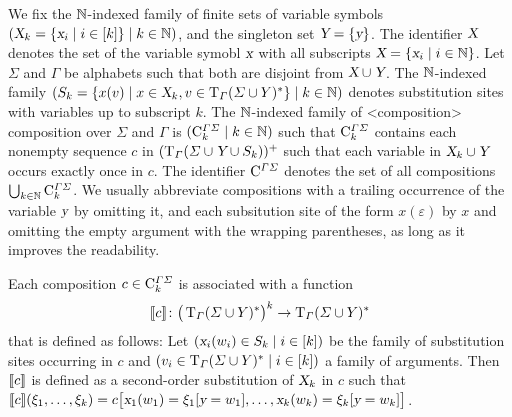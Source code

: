 \documentclass[../../document.tex]{subfiles}
\begin{document}
    \begin{definition}[Composition]
        We fix the \(\mathbb{N}\)-indexed family of finite sets of variable symbols \((\textsl{X}_k = \{\textsl{x}_i \mid i \in [k]\} \mid k \in \mathbb{N})\), and the singleton set \(\textsl{Y} = \{\textsl{y}\}\).
        The identifier \(\textsl{X}\) denotes the set of the variable symobl \(\textsl{x}\) with all subscripts \(\textsl{X} = \{\textsl{x}_i \mid i \in \mathbb{N}\}\).
        Let \(\varSigma\) and \(\varGamma\) be alphabets such that both are disjoint from \(\textsl{X} \cup \textsl{Y}\).
        The \(\mathbb{N}\)-indexed family \((S_k = \{x(v) \mid x \in \textsl{X}_k, v \in \operatorname{T}_\varGamma(\varSigma \cup Y)^*\} \mid k \in \mathbb{N})\) denotes substitution sites with variables up to subscript \(k\).
        The \(\mathbb{N}\)-indexed family of <composition>{ composition} over \(\varSigma\) and \(\varGamma\) is \((\mathrm{C}^{\varGamma\varSigma}_k \mid k \in \mathbb{N})\) such that \(\mathrm{C}^{\varGamma\varSigma}_k\) contains each nonempty sequence \(c\) in \((\operatorname{T}_\varGamma(\varSigma \cup \textsl{Y} \cup S_k))^+\) such that each variable in \(\textsl{X}_k \cup \textsl{Y}\) occurs exactly once in \(c\).
        The identifier \(\mathrm{C}^{\varGamma\varSigma}\) denotes the set of all  compositions \(\bigcup_{k \in \mathbb{N}} \mathrm{C}^{\varGamma\varSigma}_{k}\).
        We usually abbreviate compositions with a trailing occurrence of the variable \(\textsl{y}\) by omitting it, and each subsitution site of the form \(x(\varepsilon)\) by \(x\) and omitting the empty argument with the wrapping parentheses, as long as it improves the readability.

        Each composition \(c \in \mathrm{C}^{\varGamma\varSigma}_k\) is associated with a function \[
            \llbracket c\rrbracket\colon \big(\operatorname{T}_\varGamma(\varSigma \cup Y)^*\big)^k \to \operatorname{T}_\varGamma(\varSigma \cup Y)^*
        \] that is defined as follows:
            Let \((\textsl{x}_i(w_i) \in S_k \mid i \in [k])\) be the family of substitution sites occurring in \(c\) and \((v_i \in \operatorname{T}_\varGamma(\varSigma \cup Y)^* \mid i \in [k])\) a family of arguments.
            Then \(\llbracket c\rrbracket\) is defined as a second-order substitution of \(\textsl{X}_k\) in \(c\) such that \(\llbracket c\rrbracket(\xi_1, \ldots, \xi_k) = c\big[\textsl{x}_1(w_1)=\xi_1[\textsl{y}=w_1], \ldots, \textsl{x}_k(w_k)=\xi_k[\textsl{y}=w_k]\big]\).
    \end{definition}

\end{document}
